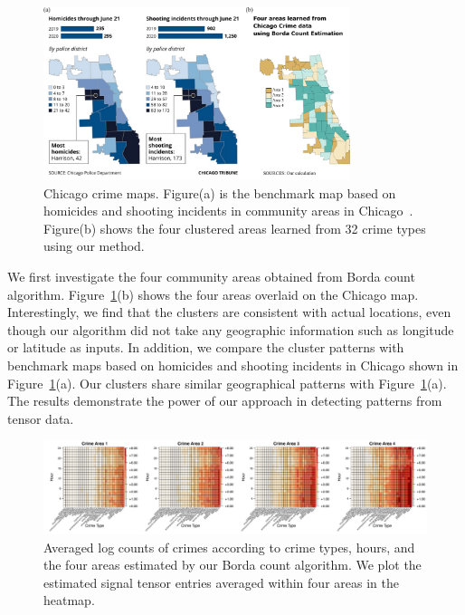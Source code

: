 \documentclass[12pt]{article}
\theoremstyle{definition}
\begin{document}
\begin{figure}[t!]
    \centering
    \includegraphics[width = 0.8\textwidth]{figure/crimecompare.pdf}
    \caption{Chicago crime maps. Figure(a) is the benchmark map based on homicides and shooting incidents in community areas in Chicago~\citep{Jeremy.2020}. Figure(b) shows the four clustered areas learned from 32 crime types using our method.}
    \label{fig:area}
\end{figure}
We first investigate the four community areas obtained from Borda count algorithm.  Figure~\ref{fig:area}(b) shows the four areas overlaid on the Chicago map. Interestingly, we find that the clusters are consistent with actual locations, even though our algorithm did not take any geographic information such as longitude or latitude as inputs. In addition, we compare the cluster patterns with benchmark maps based on homicides and shooting incidents in Chicago shown in Figure~\ref{fig:area}(a). Our clusters share similar geographical patterns with Figure~\ref{fig:area}(a). The results demonstrate the power of our approach in detecting patterns from tensor data. 


\begin{figure}[t!]
    \centering
    \includegraphics[width = \textwidth]{figure/CrimeB.pdf}
    \caption{Averaged log counts of crimes according to crime types, hours, and the four areas estimated by our Borda count algorithm. We plot the estimated signal tensor entries averaged within four areas in the heatmap.}
    \label{fig:crimeA}
\end{figure}
\end{document}

